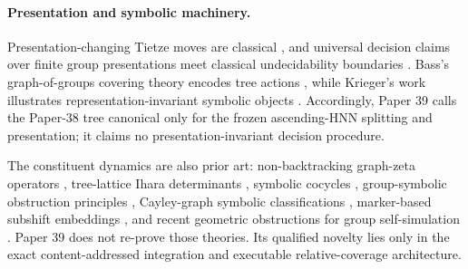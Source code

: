 \paragraph{Presentation and symbolic machinery.}
Presentation-changing Tietze moves are classical \citep{Tietze1908Invarianten},
and universal decision claims over finite group presentations meet classical
undecidability boundaries \citep{Rabin1958Recursive}.  Bass's graph-of-groups
covering theory encodes tree actions \citep{Bass1993Covering}, while Krieger's
work illustrates representation-invariant symbolic objects
\citep{Krieger2000Invariant}.  Accordingly, Paper 39 calls the Paper-38 tree
canonical only for the frozen ascending-HNN splitting and presentation; it
claims no presentation-invariant decision procedure.

The constituent dynamics are also prior art: non-backtracking graph-zeta
operators \citep{Hashimoto1989Zeta}, tree-lattice Ihara determinants
\citep{Bass1992IharaSelberg}, symbolic cocycles
\citep{Schmidt1998FundamentalCocycles}, group-symbolic obstruction principles
\citep{Bartholdi2010Gardens}, Cayley-graph symbolic classifications
\citep{AubrunBitar2024SAW}, marker-based subshift embeddings
\citep{Meyerovitch2025Embedding}, and recent geometric obstructions for group
self-simulation \citep{BarbieriEtAl2025GeometricObstruction}.  Paper 39 does
not re-prove those theories.  Its qualified novelty lies only in the exact
content-addressed integration and executable relative-coverage architecture.

